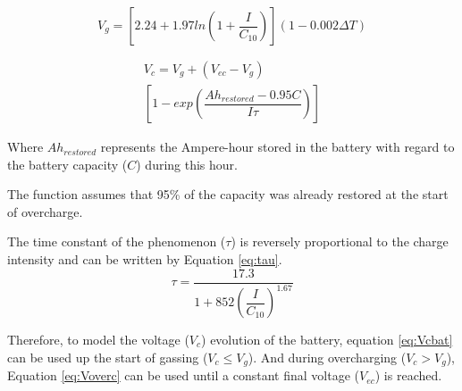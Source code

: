 \documentclass[journal]{IEEEtran}
\begin{document}
\begin{equation}
\label{eq:Vg}
V_{g} = \left[ 2.24 + 1.97 ln \left( 1+\dfrac{I}{C_{10}} \right)  \right] (1-0.002 \Delta T)
\end{equation}

\begin{multline}
\label{eq:Voverc}
V_{c} = V_{g} + (V_{ec} - V_{g}) \\ \left[ 1- exp \left( \dfrac{Ah_{restored}-0.95C}{I\tau}  \right)    \right] 
\end{multline}

Where $ Ah_{restored} $ represents the Ampere-hour stored in the battery with regard to the battery capacity ($ C $) during this hour.

The function assumes that 95\% of the capacity was already restored at the start of overcharge.

The time constant of the phenomenon ($ \tau $) is reversely proportional to the charge intensity and can be written by Equation \ref{eq:tau}.
\begin{equation}
\label{eq:tau}
\tau = \dfrac{17.3}{1+852 \left( \dfrac{I}{C_{10}} \right) ^{1.67} }
\end{equation}

Therefore, to model the voltage ($ V_{c} $) evolution of the battery, equation \ref{eq:Vcbat} can be used up the start of gassing ($ V_{c} \leq V_{g} $). And during overcharging ($ V_{c} > V_{g} $), Equation \ref{eq:Voverc} can be used until a constant final voltage ($ V_{ec} $) is reached.
\end{document}
